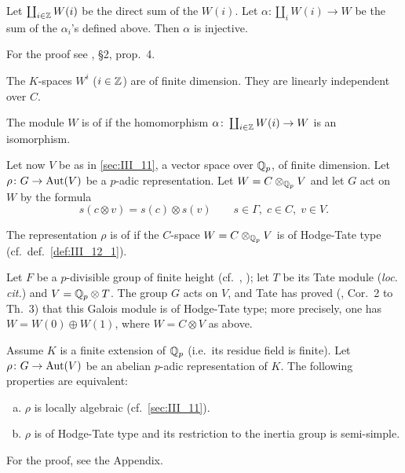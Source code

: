 \begin{prop}[Tate]
	Let $\coprod_{i\in \mathbb{Z}} W(i)$ be the direct sum of the $W(i)$. Let
	$\alpha\colon \coprod_i W(i) \to W$ be the sum of the $\alpha_i$'s
	defined above. Then $\alpha$ is injective.
\end{prop}
For the proof see \cite{27}, \S 2, prop.~4.
\begin{corp}
	The $K$-spaces $W^i$ ($i \in \mathbb{Z}$) are of finite dimension.
	They are linearly independent over $C$.
\end{corp}

\begin{mydef}\label{def:III_12_1}
	The module $W$ is of %
	if the homomorphism $\alpha\colon \coprod_{i\in\mathbb{Z}} W(i) \to W$ is an
	isomorphism.
\end{mydef}

Let now $V$ be as in \ref{sec:III_11}, a vector space over $\mathbb{Q}_p$, of finite
dimension. Let $\rho\colon G \to \operatorname{Aut}(V)$ be a $p$-adic representation. Let $W
= C \otimes_{\mathbb{Q}_p} V$ and let $G$ act on $W$ by the formula
\dpage
\[
	s(c\otimes v) = s(c) \otimes s(v) \qquad
	s\in \Gamma, \; c\in C, \; v\in V.
\]
\begin{mydef}
	The representation $\rho$ is of %
	 if the $C$-space $W = C \otimes_{\mathbb{Q}_p} V$ is of
	Hodge-Tate type (cf.\ def.~\ref{def:III_12_1}).
\end{mydef}

\begin{ex}
	Let $F$ be a $p$-divisible group of finite height (cf.\ \cite{26},
	\cite{39}); let $T$ be its Tate module (\emph{loc. cit.}) and $V = \mathbb{Q}_p
	\otimes T$. The group $G$ acts on $V$, and Tate has proved (\cite{39},
	Cor.~2 to Th.~3) that this Galois module is of Hodge-Tate type; more
	precisely, one has $W = W(0) \oplus W(1)$, where $W = C \otimes V$ as
	above.
\end{ex}
\begin{thm}[Tate]
Assume $K$ is a finite extension of $\mathbb{Q}_p$ (i.e.\ its residue field is finite).
Let $\rho\colon G \to \operatorname{Aut}(V)$ be an abelian $p$-adic representation of $K$.
The following properties are equivalent:
\begin{enumerate}[(a)]
\item $\rho$ is locally algebraic (cf.\ \ref{sec:III_11}).
\item $\rho$ is of Hodge-Tate type and its restriction to the inertia group is
	semi-simple.
\end{enumerate}
\end{thm}
For the proof, see the Appendix.

